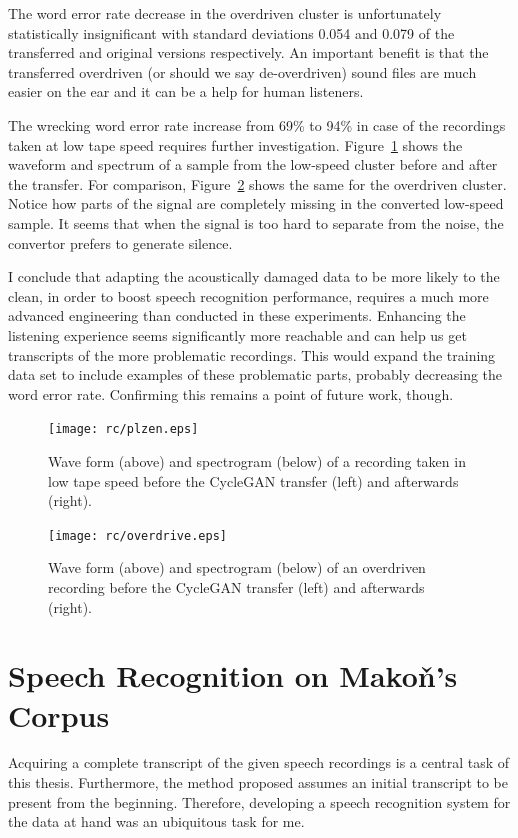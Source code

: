 \documentclass[12pt,a4paper]{report}
\begin{document}
The word error rate decrease in the overdriven cluster is unfortunately statistically
insignificant with standard deviations 0.054 and 0.079 of the transferred and
original versions respectively. An important benefit is
that the transferred overdriven (or should we say de-overdriven) sound files are
much easier on the ear and it can be a help for human listeners.

The wrecking word error rate increase from 69\% to 94\% in case of the
recordings taken at low tape speed requires further investigation.
Figure~\ref{fig:plzen} shows the waveform and spectrum of a sample from the low-speed
cluster before and after the transfer. For comparison,
Figure~\ref{fig:overdrive} shows the same for the overdriven cluster.
Notice how parts of the signal are completely missing in the converted low-speed
sample. It seems that when the signal is too hard to separate from the noise,
the convertor prefers to generate silence.

I conclude that adapting the acoustically damaged data to be more likely to the
clean, in order to boost speech recognition performance, requires a much more
advanced engineering than conducted in these experiments. Enhancing the
listening experience seems significantly more reachable and can help us get
transcripts of the more problematic recordings. This would expand the training
data set to include examples of these problematic parts, probably decreasing the
word error rate. Confirming this remains a point of future work, though.

\begin{figure}[tpb]
\centering
\texttt{[image: rc/plzen.eps]}
\caption{Wave form (above) and spectrogram (below) of a recording taken in low
tape speed before the CycleGAN transfer (left) and afterwards (right).}
\label{fig:plzen}
\end{figure}

\begin{figure}[tpb]
\centering
\texttt{[image: rc/overdrive.eps]}
\caption{Wave form (above) and spectrogram (below) of an overdriven recording
before the CycleGAN transfer (left) and afterwards (right).}
\label{fig:overdrive}
\end{figure}

\chapter{Speech Recognition on Makoň's Corpus}
\label{chap:svolocz}

Acquiring a complete transcript of the given speech recordings is a central task
of this thesis. Furthermore, the method proposed assumes an initial transcript
to be present from the beginning. Therefore, developing a speech recognition
system for the data at hand was an ubiquitous task for me.
\end{document}
